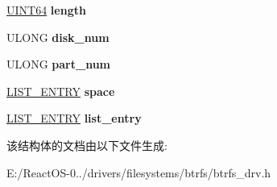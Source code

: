 \begin{DoxyCompactItemize}
\hyperlink{_processor_bind_8h_a57be03562867144161c1bfee95ca8f7c}{U\+I\+N\+T64} {\bfseries length}
\item 
\mbox{\label{structdevice_a03987ea1e54478482b8a629b45a85462}} 
U\+L\+O\+NG {\bfseries disk\+\_\+num}
\item 
\mbox{\label{structdevice_a0fc4ee12885fa37b74e2004a1d54d332}} 
U\+L\+O\+NG {\bfseries part\+\_\+num}
\item 
\mbox{\label{structdevice_a721232248d75080b8d199b35c533da98}} 
\hyperlink{struct___l_i_s_t___e_n_t_r_y}{L\+I\+S\+T\+\_\+\+E\+N\+T\+RY} {\bfseries space}
\item 
\mbox{\label{structdevice_a271a304a13de97e336447da4724ef71c}} 
\hyperlink{struct___l_i_s_t___e_n_t_r_y}{L\+I\+S\+T\+\_\+\+E\+N\+T\+RY} {\bfseries list\+\_\+entry}
\end{DoxyCompactItemize}


该结构体的文档由以下文件生成\+:\begin{DoxyCompactItemize}
\item 
E\+:/\+React\+O\+S-\/0../drivers/filesystems/btrfs/btrfs\+\_\+drv.\+h\end{DoxyCompactItemize}
